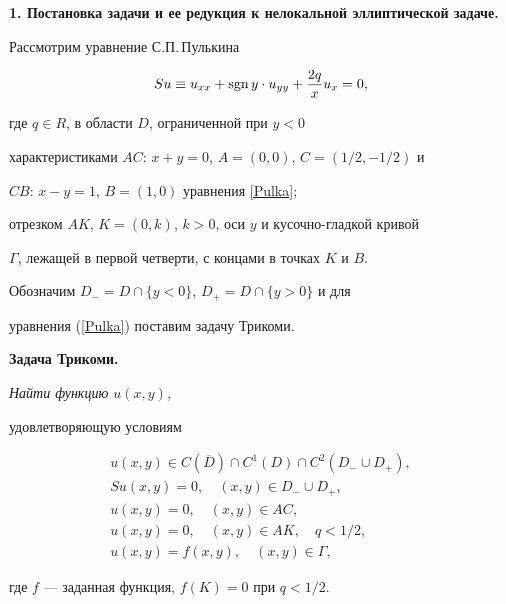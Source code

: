 \label{begin}








{\bf 1. Постановка задачи и ее редукция к нелокальной эллиптической задаче.} 


Рассмотрим уравнение С.П.\,Пулькина


\begin{equation}\label{Pulka}


Su \equiv u_{xx}+\sgn y\cdot u_{yy} +


\frac{2q}{x} u_x=0,


\end{equation}


где $q\in R$, в области $D$, ограниченной при $y<0$


характеристиками $AC$: $x+y=0$, $A=(0,0)$, $C=(1/2,-1/2)$ и


$CB$: $x-y=1$, $B=(1,0)$ уравнения \eqref{Pulka}; 


отрезком $AK$, $K=(0,k)$, $k>0$, оси $y$ и кусочно-гладкой кривой


$\Gamma$, лежащей в первой четверти, с концами в точках $K$ и $B$.





Обозначим $D_-=D\cap\{y<0\}$, $D_+=D\cap\{y>0\}$ и для 


уравнения (\ref{Pulka}) поставим задачу Трикоми.


\medskip





{\bf Задача Трикоми.} {\it Найти функцию $u(x,y)$,


удовлетворяющую условиям


\begin{gather}


\label{ClassT}


u(x,y) \in C(\overline{D}) \cap C^1(D) \cap C^2(D_-\cup D_+),\\


%


\label{Equation}


Su(x,y)=0,\quad(x,y) \in D_-\cup D_+,\\


%


\label{OnAC}


u(x,y) =0, \quad (x,y) \in AC,\\


%


\label{OnAK}


u(x,y)=0, \quad (x,y) \in AK, \quad q<1/2,\\


%


\label{OnGamma}


u(x,y) = f(x,y), \quad (x,y) \in \Gamma,


\end{gather}


где $f$ --- заданная функция, $f(K)=0$ при $q<1/2$.}


